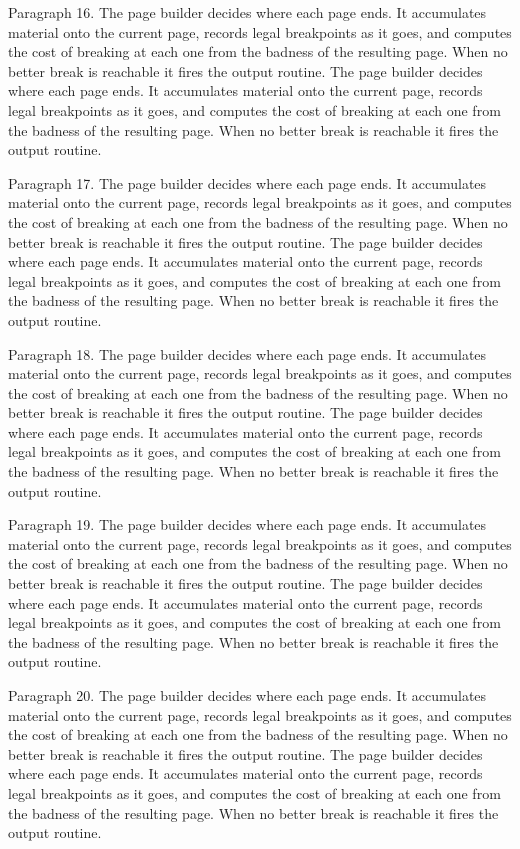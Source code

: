 Paragraph 16. The page builder decides where each page ends. It accumulates material onto the current page, records legal breakpoints as it goes, and computes the cost of breaking at each one from the badness of the resulting page. When no better break is reachable it fires the output routine. The page builder decides where each page ends. It accumulates material onto the current page, records legal breakpoints as it goes, and computes the cost of breaking at each one from the badness of the resulting page. When no better break is reachable it fires the output routine. 

Paragraph 17. The page builder decides where each page ends. It accumulates material onto the current page, records legal breakpoints as it goes, and computes the cost of breaking at each one from the badness of the resulting page. When no better break is reachable it fires the output routine. The page builder decides where each page ends. It accumulates material onto the current page, records legal breakpoints as it goes, and computes the cost of breaking at each one from the badness of the resulting page. When no better break is reachable it fires the output routine. 

Paragraph 18. The page builder decides where each page ends. It accumulates material onto the current page, records legal breakpoints as it goes, and computes the cost of breaking at each one from the badness of the resulting page. When no better break is reachable it fires the output routine. The page builder decides where each page ends. It accumulates material onto the current page, records legal breakpoints as it goes, and computes the cost of breaking at each one from the badness of the resulting page. When no better break is reachable it fires the output routine. 

Paragraph 19. The page builder decides where each page ends. It accumulates material onto the current page, records legal breakpoints as it goes, and computes the cost of breaking at each one from the badness of the resulting page. When no better break is reachable it fires the output routine. The page builder decides where each page ends. It accumulates material onto the current page, records legal breakpoints as it goes, and computes the cost of breaking at each one from the badness of the resulting page. When no better break is reachable it fires the output routine. 

Paragraph 20. The page builder decides where each page ends. It accumulates material onto the current page, records legal breakpoints as it goes, and computes the cost of breaking at each one from the badness of the resulting page. When no better break is reachable it fires the output routine. The page builder decides where each page ends. It accumulates material onto the current page, records legal breakpoints as it goes, and computes the cost of breaking at each one from the badness of the resulting page. When no better break is reachable it fires the output routine. 

